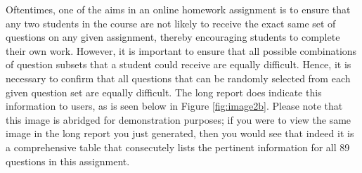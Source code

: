 \documentclass{article}\usepackage[]{graphicx}\usepackage[]{color}
\numberwithin{equation}{section} %
\begin{document}
\begin{center}
\captionsetup{width=0.75\textwidth}
\label{fig:image2a}
\end{center}

Oftentimes, one of the aims in an online homework assignment is to ensure that any two students in the course are not likely to receive the exact same set of questions on any given assignment, thereby encouraging students to complete their own work. However, it is important to ensure that all possible combinations of question subsets that a student could receive are equally difficult. Hence, it is necessary to confirm that all questions that can be randomly selected from each given question set are equally difficult. The long report does indicate this information to users, as is seen below in Figure \ref{fig:image2b}. Please note that this image is abridged for demonstration purposes; if you were to view the same image in the long report you just generated, then you would see that indeed it is a comprehensive table that consecutely lists the pertinent information for all 89 questions in this assignment. 
\end{document}
